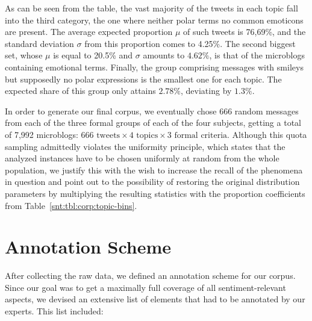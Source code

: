 As can be seen from the table, the vast majority of the tweets in each
topic fall into the third category, \ie{} the one where neither polar
terms no common emoticons are present.  The average expected
proportion $\mu$ of such tweets is 76,69\%, and the standard deviation
$\sigma$ from this proportion comes to 4.25\%.  The second biggest
set, whose $\mu$ is equal to 20.5\% and $\sigma$ amounts to $4.62\%$,
is that of the microblogs containing emotional terms.  Finally, the
group comprising messages with smileys but supposedly no polar
expressions is the smallest one for each topic.  The expected share of
this group only attains $2.78\%$, deviating by $1.3\%$.


In order to generate our final corpus, we eventually chose 666 random
messages from each of the three formal groups of each of the four
subjects, getting a total of 7,992 microblogs: $666\text{ tweets}
\times 4\text{ topics} \times 3\text{ formal criteria}$.  Although
this quota sampling admittedly violates the uniformity principle,
which states that the analyzed instances have to be chosen uniformly
at random from the whole population, we justify this with the wish to
increase the recall of the phenomena in question and point out to the
possibility of restoring the original distribution parameters by
multiplying the resulting statistics with the proportion coefficients
from Table~\ref{snt:tbl:corp:topic-bins}.

\section{Annotation Scheme}\label{subsec:snt:ascheme}
After collecting the raw data, we defined an annotation scheme for our
corpus. Since our goal was to get a maximally full coverage of all
sentiment-relevant aspects, we devised an extensive list of elements
that had to be annotated by our experts.  This list included:

